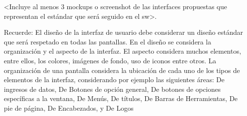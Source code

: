 <Incluye al menos 3 mockups o screenshot de las interfaces propuestas que representan el estándar que será seguido en el sw>.

Recuerde: El diseño de la interfaz de usuario debe considerar un diseño estándar que será respetado en todas las pantallas. En el diseño se considera la organización y el aspecto de la interfaz. El aspecto considera muchos elementos, entre ellos, los colores, imágenes de fondo, uso de iconos entre otros. La organización de una pantalla considera la ubicación de cada uno de los tipos de elementos de la interfaz, considerando por ejemplo las siguientes áreas:  De ingresos de datos, De Botones de opción general, De botones de opciones específicas a la ventana, De Menús, De títulos,  De Barras de Herramientas, De pie de página, De Encabezados, y De Logos
